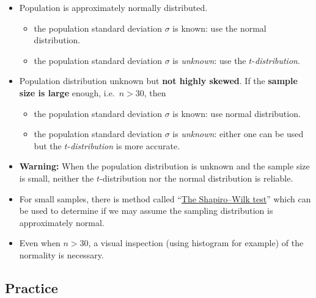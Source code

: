 \begin{itemize}
\item
  Population is approximately normally distributed.

  \begin{itemize}
  \item
    the population standard deviation \(\sigma\) is known:
    use the normal distribution.
  \item
    the population standard deviation \(\sigma\) is
    \emph{unknown}: use the
    \(t\)-\emph{distribution}.
  \end{itemize}
\item
  Population distribution unknown but \textbf{not highly skewed}. If the \textbf{sample size is large}
  enough, i.e.~\(n>30\), then

  \begin{itemize}
  \item
    the population standard deviation \(\sigma\) is known:
    use normal distribution.
  \item
    the population standard deviation \(\sigma\) is
    \emph{unknown}: either one can be used but the
    \(t\)-\emph{distribution} is more accurate.
  \end{itemize}
\item
  \textbf{Warning:} When the population distribution is unknown and the
  sample size is small, neither the \(t\)-distribution nor the
  normal distribution is reliable.
\item
  For small samples, there is method called
  ``\href{http://www.sthda.com/english/wiki/normality-test-in-r\#normality-test}{The
  Shapiro--Wilk test}'' which can be used to determine if we may assume
  the sampling distribution is approximately normal.
\item
  Even when \(n>30\), a visual inspection (using histogram for example)
  of the normality is necessary.
\end{itemize}

\hypertarget{practice}{%
\subsection{Practice}\label{practice}}

